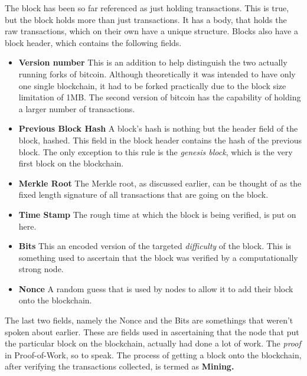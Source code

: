 \documentclass[12pt,a4paper]{report}
\begin{document}
\begin{justify}
The block has been so far referenced as just holding transactions. This is true, but the block holds more than just transactions. It has a body, that holds the raw transactions, which on their own have a unique structure. Blocks also have a block header, which contains the following fields.
\begin{itemize}
    \item \textbf{Version number}\newline
    This is an addition to help distinguish the two actually running forks of bitcoin.
    Although theoretically it was intended to have only one single blockchain, it had to be forked practically due to the block size limitation of 1MB. The second version of bitcoin has the capability of holding a larger number of transactions.
    \item \textbf{Previous Block Hash}\newline
    A block's hash is nothing but the header field of the block, hashed. This field in the block header contains the hash of the previous block. The only exception to this rule is the \textit{genesis block}, which is the very first block on the blockchain.
    \item \textbf{Merkle Root}\newline
    The Merkle root, as discussed earlier, can be thought of as the fixed length signature of all transactions that are going on the block.
    \item \textbf{Time Stamp}\newline
    The rough time at which the block is being verified, is put on here.
    \item \textbf{Bits}\newline
    This an encoded version of the targeted \textit{difficulty} of the block. This is something used to ascertain that the block was verified by a computationally strong node.
    \item \textbf{Nonce}\newline
    A random guess that is used by nodes to allow it to add their block onto the blockchain.
    
\end{itemize}

The last two fields, namely the Nonce and the Bits are somethings that weren't spoken about earlier. These are fields used in ascertaining that the node that put the particular block on the blockchain, actually had done a lot of work. The \textit{proof} in Proof-of-Work, so to speak. The process of getting a block onto the blockchain, after verifying the transactions collected, is termed as \textbf{Mining.}


\end{justify}
\end{document}

